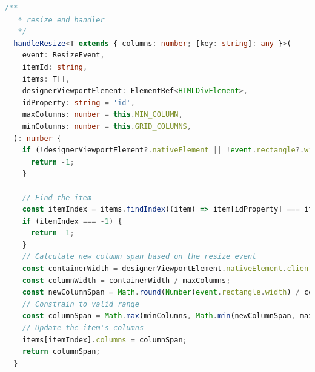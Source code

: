 \documentclass[a4paper,11pt]{article}
\begin{document}
\newpage
\renewcommand{\lstlistingname}{\texttt{Resize Function in Builder Service}}
\begin{lstlisting}[language=TypeScript, caption={\texttt{handleSimpleDrop} function}]
 /**
   * resize end handler
   */
  handleResize<T extends { columns: number; [key: string]: any }>(
    event: ResizeEvent,
    itemId: string,
    items: T[],
    designerViewportElement: ElementRef<HTMLDivElement>,
    idProperty: string = 'id',
    maxColumns: number = this.MIN_COLUMN,
    minColumns: number = this.GRID_COLUMNS,
  ): number {
    if (!designerViewportElement?.nativeElement || !event.rectangle?.width) {
      return -1;
    }

    // Find the item
    const itemIndex = items.findIndex((item) => item[idProperty] === itemId);
    if (itemIndex === -1) {
      return -1;
    }
    // Calculate new column span based on the resize event
    const containerWidth = designerViewportElement.nativeElement.clientWidth;
    const columnWidth = containerWidth / maxColumns;
    const newColumnSpan = Math.round(Number(event.rectangle.width) / columnWidth);
    // Constrain to valid range
    const columnSpan = Math.max(minColumns, Math.min(newColumnSpan, maxColumns));
    // Update the item's columns
    items[itemIndex].columns = columnSpan;
    return columnSpan;
  }
\end{lstlisting}
\end{document}
